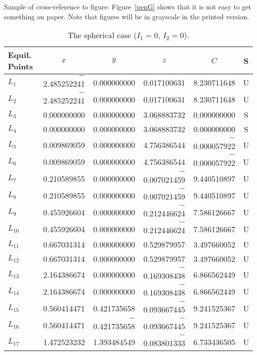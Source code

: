 \documentclass[te,nameyear,final,supplement]{econsocart}
\theoremstyle{plain}
\theoremstyle{definition}
\begin{document}
Sample of cross-reference to figure: Figure~\ref{penG} shows that it is not easy to get something on paper. Note that figures will be in grayscale in the printed version.
\begin{table*}
\caption{The spherical case ($I_1=0$, $I_2=0$).}
\label{sphericcase}
\begin{tabular}{@{}lrrrrc@{}@{}}
\hline
Equil. Points
& \multicolumn{1}{c}{$x$}
& \multicolumn{1}{c}{$y$}
& \multicolumn{1}{c}{$z$}
& \multicolumn{1}{c}{$C$}
& S \\
\hline
$L_1$    & $-$2.485252241 & 0.000000000    & 0.017100631    & 8.230711648    & U \\
$L_2$    & $-$2.485252241 & 0.000000000    & 0.017100631    & 8.230711648    & U \\
$L_3$    & 0.000000000    & 0.000000000    & 3.068883732    & 0.000000000    & S \\
$L_4$    & 0.000000000    & 0.000000000    & 3.068883732    & 0.000000000    & S \\
$L_5$    & 0.009869059    & 0.000000000    & 4.756386544    & $-$0.000057922 & U \\
$L_6$    & 0.009869059    & 0.000000000    & 4.756386544    & $-$0.000057922 & U \\
$L_7$    & 0.210589855    & 0.000000000    & $-$0.007021459 & 9.440510897    & U \\
$L_8$    & 0.210589855    & 0.000000000    & $-$0.007021459 & 9.440510897    & U \\
$L_9$    & 0.455926604    & 0.000000000    & $-$0.212446624 & 7.586126667    & U \\
$L_{10}$    & 0.455926604    & 0.000000000    & $-$0.212446624 & 7.586126667    & U \\
$L_{11}$    & 0.667031314    & 0.000000000    & 0.529879957    & 3.497660052    & U \\
$L_{12}$    & 0.667031314    & 0.000000000    & 0.529879957    & 3.497660052    & U \\
$L_{13}$    & 2.164386674    & 0.000000000    & $-$0.169308438 & 6.866562449    & U \\
$L_{14}$    & 2.164386674    & 0.000000000    & $-$0.169308438 & 6.866562449    & U \\
$L_{15}$    & 0.560414471    & 0.421735658    & $-$0.093667445 & 9.241525367    & U \\
$L_{16}$    & 0.560414471    & $-$0.421735658 & $-$0.093667445 & 9.241525367    & U \\
$L_{17}$ & 1.472523232    & 1.393484549    & $-$0.083801333 & 6.733436505    & U \\

\end{tabular}
\end{table*}
\end{document}
